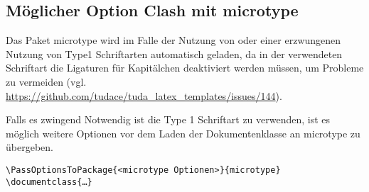 \documentclass[
	german,%
	accentcolor=9c,%
]{tudapub}
\newcommand*{\pkg}[1]{\textsf{#1}}
\begin{document}
\subsection{Möglicher Option Clash mit microtype}
Das Paket \pkg{microtype} wird im Falle der Nutzung von  oder einer erzwungenen Nutzung von Type1 Schriftarten automatisch geladen, da in der verwendeten Schriftart die Ligaturen für Kapitälchen deaktiviert werden müssen, um Probleme zu vermeiden (vgl. \url{https://github.com/tudace/tuda_latex_templates/issues/144}).

Falls es zwingend Notwendig ist die Type 1 Schriftart zu verwenden, ist es möglich weitere Optionen vor dem Laden der Dokumentenklasse an \pkg{microtype} zu übergeben.

\begin{verbatim}
\PassOptionsToPackage{<microtype Optionen>}{microtype}
\documentclass{…}
\end{verbatim}
\appendix

\printbibliography
\end{document}
